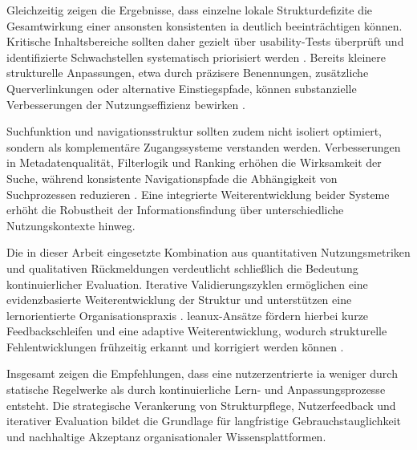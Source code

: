 Gleichzeitig zeigen die Ergebnisse, dass einzelne lokale Strukturdefizite die Gesamtwirkung einer ansonsten konsistenten \Gls{ia} deutlich beeinträchtigen können. Kritische Inhaltsbereiche sollten daher gezielt über \Gls{usability}-Tests überprüft und identifizierte Schwachstellen systematisch priorisiert werden \cite{121:NNGUsabilityTesting}. Bereits kleinere strukturelle Anpassungen, etwa durch präzisere Benennungen, zusätzliche Querverlinkungen oder alternative Einstiegspfade, können substanzielle Verbesserungen der Nutzungseffizienz bewirken \cite{303:Rosenfeld2015}.

Suchfunktion und \Gls{navigationsstruktur} sollten zudem nicht isoliert optimiert, sondern als komplementäre Zugangssysteme verstanden werden. Verbesserungen in Metadatenqualität, Filterlogik und Ranking erhöhen die Wirksamkeit der Suche, während konsistente Navigationspfade die Abhängigkeit von Suchprozessen reduzieren \cite{111:NNGSearchVisible,309:NNGContentGovernance}. Eine integrierte Weiterentwicklung beider Systeme erhöht die Robustheit der Informationsfindung über unterschiedliche Nutzungskontexte hinweg.

Die in dieser Arbeit eingesetzte Kombination aus quantitativen Nutzungsmetriken und qualitativen Rückmeldungen verdeutlicht schließlich die Bedeutung kontinuierlicher Evaluation. Iterative Validierungszyklen ermöglichen eine evidenzbasierte Weiterentwicklung der Struktur und unterstützen eine lernorientierte Organisationspraxis \cite{124:Triangulation2023,121:NNGUsabilityTesting}. \Gls{leanux}-Ansätze fördern hierbei kurze Feedbackschleifen und eine adaptive Weiterentwicklung, wodurch strukturelle Fehlentwicklungen frühzeitig erkannt und korrigiert werden können \cite{424:GothelfSeiden2016}.

Insgesamt zeigen die Empfehlungen, dass eine nutzerzentrierte \Gls{ia} weniger durch statische Regelwerke als durch kontinuierliche Lern- und Anpassungsprozesse entsteht. Die strategische Verankerung von Strukturpflege, Nutzerfeedback und iterativer Evaluation bildet die Grundlage für langfristige Gebrauchstauglichkeit und nachhaltige Akzeptanz organisationaler Wissensplattformen.
